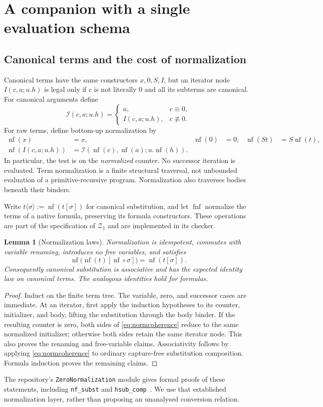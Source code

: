 \documentclass[11pt]{article}
\newtheorem{lemma}[theorem]{Lemma}
\theoremstyle{definition}\newtheorem{definition}[theorem]{Definition}
\newcommand{\Zone}{\mathcal Z_1}
\newcommand{\nf}{\operatorname{nf}}
\newcommand{\fnf}{\operatorname{fnf}}
\newcommand{\sI}{\mathcal I}
\newcommand{\syn}{\equiv}
\begin{document}
\section{A companion with a single evaluation schema}
\label{sec:normal}

\subsection{Canonical terms and the cost of normalization}

Canonical terms have the same constructors $x,0,S,I$, but an iterator
node $I(c,a;u.h)$ is legal only if $c$ is not literally $0$ and all its
subterms are canonical. For canonical arguments define
\[
 \sI(c,a;u.h)=
 \begin{cases}a,&c\syn0,\\I(c,a;u.h),&c\not\syn0.\end{cases}
\]
For raw terms, define bottom-up normalization by
\begin{align*}
 \nf(x)&=x,&\nf(0)&=0,&\nf(St)&=S\nf(t),\\
 \nf(I(c,a;u.h))&=\sI(\nf(c),\nf(a);u.\nf(h)).
\end{align*}
In particular, the test is on the \emph{normalized} counter. No
successor iteration is evaluated. Term normalization is a finite
structural traversal, not unbounded evaluation of a primitive-recursive
program. Normalization also traverses bodies beneath their binders.

Write $t\langle\sigma\rangle:=\nf(t[\sigma])$ for canonical
substitution, and let $\fnf$ normalize the terms of a native formula,
preserving its formula constructors. These operations are part of the
specification of $\Zone$ and are implemented in its checker.

\begin{lemma}[Normalization laws]\label{lem:normalization}
Normalization is idempotent, commutes with variable renaming, introduces
no free variables, and satisfies
\[
 \nf\bigl(\nf(t)[\nf\circ\sigma]\bigr)=\nf(t[\sigma]).
 \tag{N}\label{eq:normcoherence}
\]
Consequently canonical substitution is associative and has the expected
identity law on canonical terms. The analogous identities hold for
formulas.
\end{lemma}
\begin{proof}
Induct on the finite term tree. The variable, zero, and successor cases
are immediate. At an iterator, first apply the induction hypotheses to
its counter, initializer, and body, lifting the substitution through the
body binder. If the resulting counter is zero, both sides of
\eqref{eq:normcoherence} reduce to the same normalized initializer;
otherwise both sides retain the same iterator node. This also proves
the renaming and free-variable claims. Associativity follows by applying
\eqref{eq:normcoherence} to ordinary capture-free substitution
composition. Formula induction proves the remaining claims.
\end{proof}
The repository's \texttt{ZeroNormalization} module gives formal proofs
of these statements, including \texttt{nf\_subst} and
\texttt{hsub\_comp}~\cite{normal}. We use that established normalization
layer, rather than proposing an unanalysed conversion relation.
\end{document}
